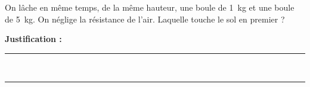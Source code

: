 On lâche en même temps, de la même hauteur, une boule de \qty{1}{kg} et une boule de \qty{5}{kg}. On néglige la résistance de l'air. Laquelle touche le sol en premier ?

\choices

\noindent\textbf{Justification :} \hrulefill \\[2.5ex]
\rule{\linewidth}{0.4pt} \\[2.5ex]
\rule{\linewidth}{0.4pt}
\vfill
